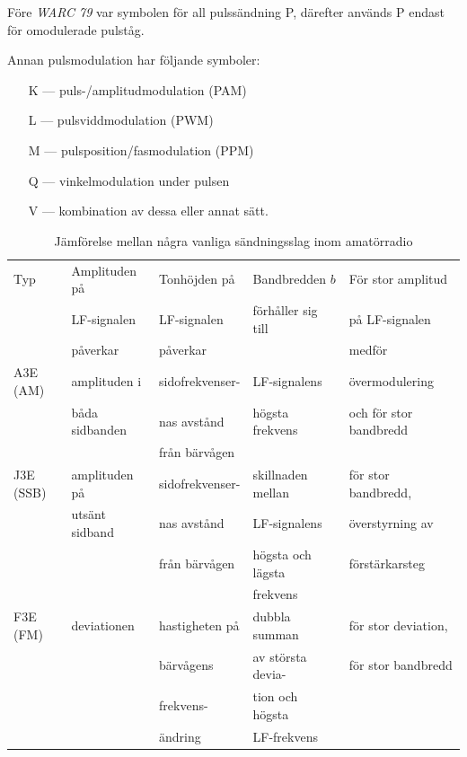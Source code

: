 Före \emph{WARC 79} var symbolen för all pulssändning P, därefter används P 
endast för omodulerade pulståg.

Annan pulsmodulation har följande symboler:

\begin{itemize}
	\item[K] --- puls-/amplitudmodulation (PAM)
	\item[L] --- pulsviddmodulation (PWM)
	\item[M] --- pulsposition/fasmodulation (PPM)
	\item[Q] --- vinkelmodulation under pulsen
	\item[V] --- kombination av dessa eller annat sätt.
\end{itemize}

\begin{table}[ht]
\tiny
\begin{center}
\begin{tabular}{|l|l|l|l|l|}
	\hline
	Typ       & Amplituden på  & Tonhöjden på    & Bandbredden $b$      & För stor amplitud      \\
	          & LF-signalen    & LF-signalen     & förhåller sig till & på LF-signalen         \\
	          & påverkar       & påverkar        &                    & medför                 \\ \hline
	A3E (AM)  & amplituden i   & sidofrekvenser- & LF-signalens       & övermodulering         \\
	          & båda sidbanden & nas avstånd     & högsta frekvens    & och för stor bandbredd \\
	          &                & från bärvågen   &                    &  \\
	J3E (SSB) & amplituden på  & sidofrekvenser- & skillnaden mellan  & för stor bandbredd,    \\
	          & utsänt sidband & nas avstånd     & LF-signalens       & överstyrning av        \\
	          &                & från bärvågen   & högsta och lägsta  & förstärkarsteg         \\
	          &                &                 & frekvens           &  \\
	F3E (FM)  & deviationen    & hastigheten på  & dubbla summan      & för stor deviation,    \\
	          &                & bärvågens       & av största devia-  & för stor bandbredd     \\
	          &                & frekvens-       & tion och högsta    &  \\
	          &                & ändring         & LF-frekvens        &  \\ \hline
\end{tabular}
\end{center}
\caption{Jämförelse mellan några vanliga sändningsslag inom amatörradio}
\normalsize
\end{table}

